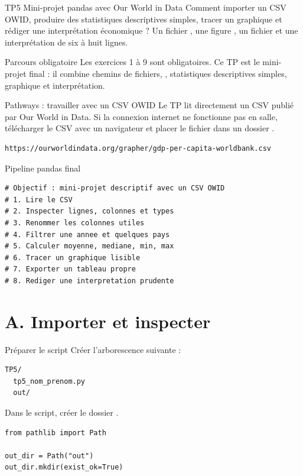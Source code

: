 \documentclass[11pt,a4paper]{article}
\begin{document}
\workbooktitle
  {TP5}
  {Mini-projet pandas avec Our World in Data}
  {Comment importer un CSV OWID, produire des statistiques descriptives simples, tracer un graphique et rédiger une interprétation économique ?}
  {Un fichier , une figure , un fichier  et une interprétation de six à huit lignes.}

\begin{checkpointbox}{Parcours obligatoire}
Les exercices 1 à 9 sont obligatoires. Ce TP est le mini-projet final : il combine chemins de fichiers, , statistiques descriptives simples, graphique et interprétation.
\end{checkpointbox}

\begin{pathwaybox}{Pathways : travailler avec un CSV OWID}
Le TP lit directement un CSV publié par Our World in Data. Si la connexion internet ne fonctionne pas en salle, télécharger le CSV avec un navigateur et placer le fichier dans un dossier .
\begin{lstlisting}[language=terminal]
https://ourworldindata.org/grapher/gdp-per-capita-worldbank.csv
\end{lstlisting}
\end{pathwaybox}

\begin{pseudocodeexercise}{Pipeline pandas final}
\begin{lstlisting}
# Objectif : mini-projet descriptif avec un CSV OWID
# 1. Lire le CSV
# 2. Inspecter lignes, colonnes et types
# 3. Renommer les colonnes utiles
# 4. Filtrer une annee et quelques pays
# 5. Calculer moyenne, mediane, min, max
# 6. Tracer un graphique lisible
# 7. Exporter un tableau propre
# 8. Rediger une interpretation prudente
\end{lstlisting}
\end{pseudocodeexercise}

\section*{A. Importer et inspecter}

\begin{mandatoryexercise}{Préparer le script}
Créer l'arborescence suivante :
\begin{lstlisting}[language=terminal]
TP5/
  tp5_nom_prenom.py
  out/
\end{lstlisting}
Dans le script, créer le dossier .
\begin{lstlisting}
from pathlib import Path

out_dir = Path("out")
out_dir.mkdir(exist_ok=True)
\end{lstlisting}
\end{mandatoryexercise}
\end{document}
